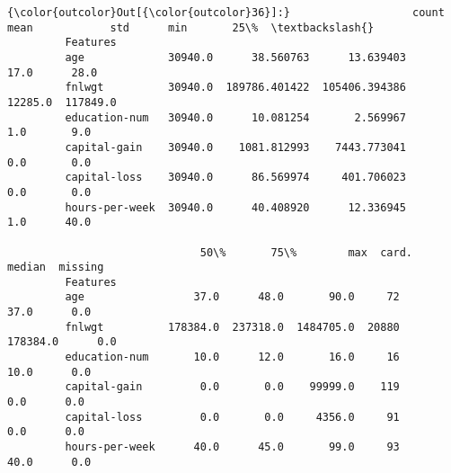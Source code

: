 \documentclass[11pt]{article}
\begin{document}
\begin{Verbatim}[commandchars=\\\{\}]
{\color{outcolor}Out[{\color{outcolor}36}]:}                   count           mean            std      min       25\%  \textbackslash{}
         Features                                                                   
         age             30940.0      38.560763      13.639403     17.0      28.0   
         fnlwgt          30940.0  189786.401422  105406.394386  12285.0  117849.0   
         education-num   30940.0      10.081254       2.569967      1.0       9.0   
         capital-gain    30940.0    1081.812993    7443.773041      0.0       0.0   
         capital-loss    30940.0      86.569974     401.706023      0.0       0.0   
         hours-per-week  30940.0      40.408920      12.336945      1.0      40.0   
         
                              50\%       75\%        max  card.    median  missing  
         Features                                                                 
         age                 37.0      48.0       90.0     72      37.0      0.0  
         fnlwgt          178384.0  237318.0  1484705.0  20880  178384.0      0.0  
         education-num       10.0      12.0       16.0     16      10.0      0.0  
         capital-gain         0.0       0.0    99999.0    119       0.0      0.0  
         capital-loss         0.0       0.0     4356.0     91       0.0      0.0  
         hours-per-week      40.0      45.0       99.0     93      40.0      0.0  
\end{Verbatim}
            
\end{document}
